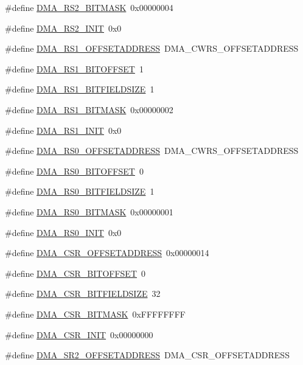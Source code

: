 \begin{DoxyCompactItemize}
\item 
\#define \hyperlink{a00547_a9217ea018c1d8adea8a815edcc8895cc}{DMA\_\-RS2\_\-BITMASK}~0x00000004
\item 
\#define \hyperlink{a00547_acf403dbc6f7c038de5dbe612f2e4cff5}{DMA\_\-RS2\_\-INIT}~0x0
\item 
\#define \hyperlink{a00547_aad1b0e86fac1c051f44735132090216a}{DMA\_\-RS1\_\-OFFSETADDRESS}~DMA\_\-CWRS\_\-OFFSETADDRESS
\item 
\#define \hyperlink{a00547_ab3cecf007e51d2a7735c33e9021d9f92}{DMA\_\-RS1\_\-BITOFFSET}~1
\item 
\#define \hyperlink{a00547_a0ac6f5b050444b2a00967ea6a51db34c}{DMA\_\-RS1\_\-BITFIELDSIZE}~1
\item 
\#define \hyperlink{a00547_ab504fb006839c4a9e67dc144ec32efff}{DMA\_\-RS1\_\-BITMASK}~0x00000002
\item 
\#define \hyperlink{a00547_af8c13a81cc73860bcb15d6a7d4ca16d7}{DMA\_\-RS1\_\-INIT}~0x0
\item 
\#define \hyperlink{a00547_acb14db5c688af99267d8520a441073e3}{DMA\_\-RS0\_\-OFFSETADDRESS}~DMA\_\-CWRS\_\-OFFSETADDRESS
\item 
\#define \hyperlink{a00547_a04e836a71aa1a1b7c3d94d315cbec34b}{DMA\_\-RS0\_\-BITOFFSET}~0
\item 
\#define \hyperlink{a00547_a530918fc7f88b1a6acbd32a5cbba4fd9}{DMA\_\-RS0\_\-BITFIELDSIZE}~1
\item 
\#define \hyperlink{a00547_aa369513e546dacde1f08eb76869894c5}{DMA\_\-RS0\_\-BITMASK}~0x00000001
\item 
\#define \hyperlink{a00547_a29e2fa5db3db9c693c3ad57f77edd9f7}{DMA\_\-RS0\_\-INIT}~0x0
\item 
\#define \hyperlink{a00547_ab811917abbde7042aac98e5cd68a2b57}{DMA\_\-CSR\_\-OFFSETADDRESS}~0x00000014
\item 
\#define \hyperlink{a00547_a60aa2a57bebc64a52d6f59cae5992e24}{DMA\_\-CSR\_\-BITOFFSET}~0
\item 
\#define \hyperlink{a00547_aabcdec1620a7c21914768bec9d7d15f3}{DMA\_\-CSR\_\-BITFIELDSIZE}~32
\item 
\#define \hyperlink{a00547_ae27eb5f31031160b8c236fdedc4e6bab}{DMA\_\-CSR\_\-BITMASK}~0xFFFFFFFF
\item 
\#define \hyperlink{a00547_addd2e3f858b46b2a67caa2010fef501d}{DMA\_\-CSR\_\-INIT}~0x00000000
\item 
\#define \hyperlink{a00547_a572efc5b5c8c74bbb08f69c023b7a776}{DMA\_\-SR2\_\-OFFSETADDRESS}~DMA\_\-CSR\_\-OFFSETADDRESS
\item 

\end{DoxyCompactItemize}
